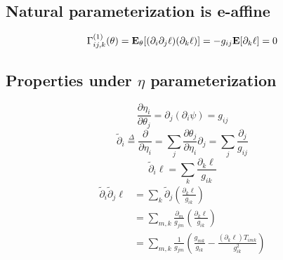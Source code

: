 \documentclass[11pt]{article}
\begin{document}
\subsection{Natural parameterization is e-affine}

\[
\Gamma^{(1)}_{ij, k}(\theta) = \textbf{E}_\theta[(\partial_i \partial_j \ell)(\partial_k \ell)] = -g_{ij} \textbf{E}[\partial_k \ell] = 0
\]

\subsection{Properties under $\eta$ parameterization}


\[
\frac{\partial \eta_i}{\partial \theta_j} = \partial_j (\partial_i \psi) = g_{ij}
\]
\[
\tilde{\partial}_i \stackrel{\Delta}{=} \frac{\partial}{\partial \eta_i} = \sum_j \frac{\partial \theta_j}{\partial \eta_i} \partial_j = \sum_j \frac{\partial_j}{g_{ij}}
\]
\[
\tilde{\partial}_i \ell = \sum_k \frac{\partial_k \ell}{g_{ik}}
\]
\begin{align*}
\tilde{\partial}_i \tilde{\partial}_j \ell &= \sum_k \tilde{\partial}_j \left(\frac{\partial_k \ell}{g_{ik}}\right)
\\&= \sum_{m, k} \frac{\partial_m}{g_{jm}} \left(\frac{\partial_k \ell}{g_{ik}}\right)
\\& = \sum_{m,k} \frac{1}{g_{jm}}\left( \frac{g_{mk}}{g_{ik}} - \frac{(\partial_k \ell)T_{imk}}{g_{ik}^2}  \right)
\end{align*}
\end{document}
